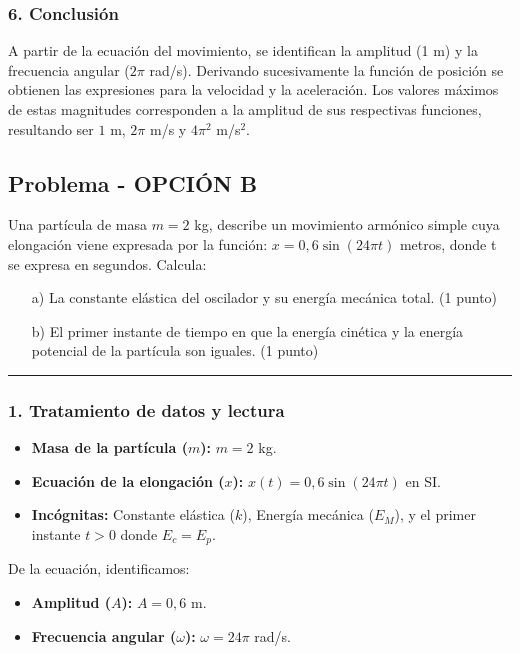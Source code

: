 \subsubsection*{6. Conclusión}
\begin{cajaconclusion}
A partir de la ecuación del movimiento, se identifican la amplitud (1 m) y la frecuencia angular ($2\pi$ rad/s). Derivando sucesivamente la función de posición se obtienen las expresiones para la velocidad y la aceleración. Los valores máximos de estas magnitudes corresponden a la amplitud de sus respectivas funciones, resultando ser $1$ m, $2\pi$ m/s y $4\pi^2$ m/s$^2$.
\end{cajaconclusion}

\newpage

\subsection{Problema  - OPCIÓN B}
\label{subsec:2B_2011_sep_ext}

\begin{cajaenunciado}
Una partícula de masa $m=2$ kg, describe un movimiento armónico simple cuya elongación viene expresada por la función: $x=0,6\sin(24\pi t)$ metros, donde t se expresa en segundos. Calcula:
\begin{enumerate}
    \item[a)] La constante elástica del oscilador y su energía mecánica total. (1 punto)
    \item[b)] El primer instante de tiempo en que la energía cinética y la energía potencial de la partícula son iguales. (1 punto)
\end{enumerate}
\end{cajaenunciado}
\hrule

\subsubsection*{1. Tratamiento de datos y lectura}
\begin{itemize}
    \item \textbf{Masa de la partícula ($m$):} $m = 2$ kg.
    \item \textbf{Ecuación de la elongación ($x$):} $x(t) = 0,6\sin(24\pi t)$ en SI.
    \item \textbf{Incógnitas:} Constante elástica ($k$), Energía mecánica ($E_M$), y el primer instante $t>0$ donde $E_c = E_p$.
\end{itemize}
De la ecuación, identificamos:
\begin{itemize}
    \item \textbf{Amplitud ($A$):} $A = 0,6$ m.
    \item \textbf{Frecuencia angular ($\omega$):} $\omega = 24\pi$ rad/s.
\end{itemize}

